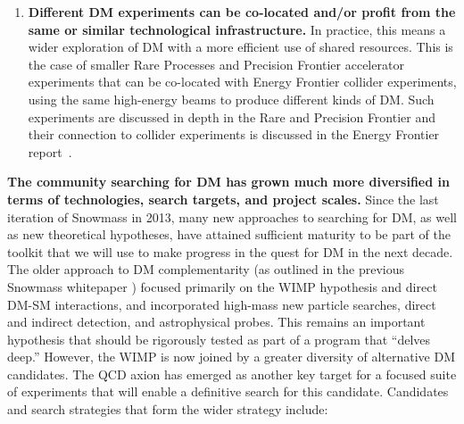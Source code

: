 \documentclass[nofootinbib]{article}
\begin{document}
\begin{enumerate}
\item \textbf{Different DM experiments can be co-located and/or profit from the same or similar technological infrastructure.} In practice, this means a wider exploration of DM with a more efficient use of shared resources. This is the case of smaller Rare Processes and Precision Frontier accelerator experiments that can be co-located with Energy Frontier collider experiments, using the same high-energy beams to produce different kinds of DM. Such experiments are discussed in depth in the Rare and Precision Frontier and their connection to collider experiments is discussed in the Energy Frontier report~\cite{Energy-Frontier-Report}.  %

\end{enumerate}

\textbf{The community searching for DM has grown much more diversified in terms of technologies, search targets, and project scales.} 
Since the last iteration of Snowmass in 2013, many new approaches to searching for DM, as well as new theoretical hypotheses, have attained sufficient maturity to be part of the toolkit that we will use to make progress in the quest for DM in the next decade. 
The older approach to DM complementarity (as outlined in the previous Snowmass whitepaper \cite{Snowmass2013CosmicFrontierWorkingGroups1-4:2013wfj}) focused primarily on the WIMP hypothesis and direct DM-SM interactions, and incorporated high-mass new particle searches, direct and indirect detection, and astrophysical probes. This remains an important hypothesis that should be rigorously tested as part of a program that ``delves deep.'' However, the WIMP is now joined by a greater diversity of alternative DM candidates. The QCD axion has emerged as another key target for a focused suite of experiments that will enable a definitive search for this candidate. Candidates and search strategies that form the wider strategy include:

\end{document}
